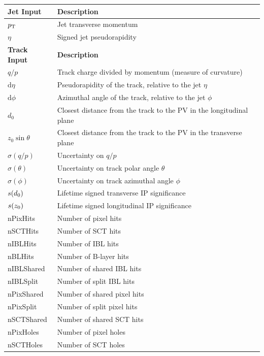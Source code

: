 \begin{table}[!htbp]
  \footnotesize\centering
  \setlength{\tabcolsep}{0.5em} %
  \begin{tabular}{ll}
    \toprule\hline 
    \textbf{Jet Input} & \textbf{Description} \\
    \hline
    $p_{\text{T}}$ & Jet transverse momentum \\
    $\eta$ & Signed jet pseudorapidity \\
    \toprule
    \textbf{Track Input} & \textbf{Description} \\
    \hline
    $q/p$ & Track charge divided by momentum (measure of curvature) \\
    $\mathrm{d}\eta$ & Pseudorapidity of the track, relative to the jet $\eta$ \\
    $\mathrm{d}\phi$  & Azimuthal angle of the track, relative to the jet $\phi$ \\
    $d_0$  & Closest distance from the track to the PV in the longitudinal plane \\
    $z_0 \sin\theta$  & Closest distance from the track to the PV in the transverse plane \\
    $\sigma(q/p)$ & Uncertainty on $q/p$ \\
    $\sigma(\theta)$ & Uncertainty on track polar angle $\theta$ \\
    $\sigma(\phi)$  & Uncertainty on track azimuthal angle $\phi$ \\
    $s(d_0)$  & Lifetime signed transverse IP significance \\
    $s(z_0)$  & Lifetime signed longitudinal IP significance \\
    nPixHits   & Number of pixel hits \\
    nSCTHits   & Number of SCT hits \\
    nIBLHits   & Number of IBL hits \\
    nBLHits    & Number of B-layer hits \\
    nIBLShared & Number of shared IBL hits \\
    nIBLSplit  & Number of split IBL hits \\
    nPixShared & Number of shared pixel hits \\
    nPixSplit  & Number of split pixel hits \\
    nSCTShared & Number of shared SCT hits \\
    nPixHoles  & Number of pixel holes \\
    nSCTHoles  & Number of SCT holes \\

\end{tabular}
\end{table}
